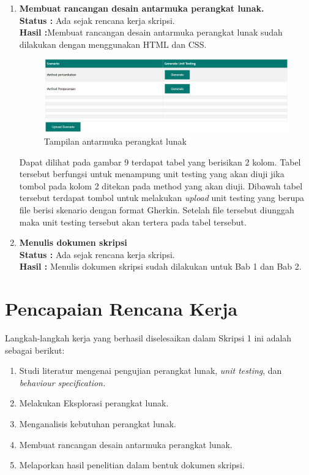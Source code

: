 \documentclass[a4paper,twoside]{article}
\begin{document}
\begin{enumerate}
		\item \textbf{Membuat rancangan desain antarmuka perangkat lunak.}\\
		{\bf Status :} Ada sejak rencana kerja skripsi.\\
		{\bf Hasil :}Membuat rancangan desain antarmuka perangkat lunak sudah dilakukan dengan menggunakan HTML dan CSS.
		\begin{figure}[h!]
			\includegraphics[scale=0.45]{../DokumenSkripsi/gambar/uiFix}
			\centering
			\caption{Tampilan antarmuka perangkat lunak}
		\end{figure}
		Dapat dilihat pada gambar 9 terdapat tabel yang berisikan 2 kolom. Tabel tersebut berfungsi untuk menampung unit testing yang akan diuji jika tombol pada kolom 2 ditekan pada method yang akan diuji. Dibawah tabel tersebut terdapat tombol untuk melakukan \textit{upload} unit testing yang berupa file berisi skenario dengan format Gherkin. Setelah file tersebut diunggah maka unit testing tersebut akan tertera pada tabel tersebut.


		\item \textbf{Menulis dokumen skripsi}\\
		{\bf Status :} Ada sejak rencana kerja skripsi.\\
		{\bf Hasil :} Menulis dokumen skripsi sudah dilakukan untuk Bab 1 dan Bab 2.

	\end{enumerate}

\section{Pencapaian Rencana Kerja}
Langkah-langkah kerja yang berhasil diselesaikan dalam Skripsi 1 ini adalah sebagai berikut:
\begin{enumerate}
\item Studi literatur mengenai pengujian perangkat lunak, \textit{unit testing}, dan \textit{behaviour specification.}
\item Melakukan Eksplorasi perangkat lunak.
\item Menganalisis kebutuhan perangkat lunak.
\item Membuat rancangan desain antarmuka perangkat lunak.
\item Melaporkan hasil penelitian dalam bentuk dokumen skripsi.

\end{enumerate}
\end{document}
